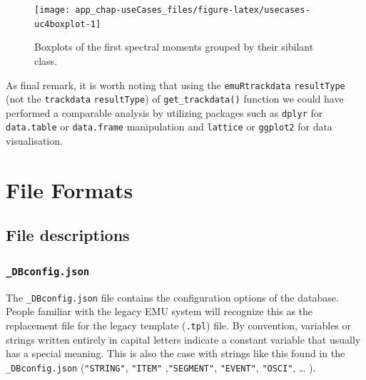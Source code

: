 \documentclass[]{book}
\newenvironment{Shaded}{\begin{snugshade}}{\end{snugshade}}
\newcommand{\DataTypeTok}[1]{\textcolor[rgb]{0.13,0.29,0.53}{#1}}
\newcommand{\KeywordTok}[1]{\textcolor[rgb]{0.13,0.29,0.53}{\textbf{#1}}}
\newcommand{\NormalTok}[1]{#1}
\newcommand{\OperatorTok}[1]{\textcolor[rgb]{0.81,0.36,0.00}{\textbf{#1}}}
\newcommand{\StringTok}[1]{\textcolor[rgb]{0.31,0.60,0.02}{#1}}
\begin{document}
\begin{Shaded}
\end{Shaded}

\begin{figure}

{\centering \texttt{[image: app\_chap-useCases\_files/figure-latex/usecases-uc4boxplot-1]} 

}

\caption{Boxplots of the first spectral moments grouped by their sibilant class.}\label{fig:usecases-uc4boxplot}
\end{figure}

As final remark, it is worth noting that using the \texttt{emuRtrackdata} \texttt{resultType} (not the \texttt{trackdata} \texttt{resultType}) of \texttt{get\_trackdata()} function we could have performed a comparable analysis by utilizing packages such as \texttt{dplyr} for \texttt{data.table} or \texttt{data.frame} manipulation and \texttt{lattice} or \texttt{ggplot2} for data visualisation.

\hypertarget{app-chap:fileFormats}{%
\chapter{File Formats}\label{app-chap:fileFormats}}

\hypertarget{file-descriptions}{%
\section{File descriptions}\label{file-descriptions}}

\hypertarget{subsec:app-chapFileFormatsDBconfig}{%
\subsection{\texorpdfstring{\texttt{\_DBconfig.json}}{\_DBconfig.json}}\label{subsec:app-chapFileFormatsDBconfig}}

The \texttt{\_DBconfig.json} file contains the configuration options of the database. People familiar with the legacy EMU system will recognize this as the replacement file for the legacy template (\texttt{.tpl}) file. By convention, variables or strings written entirely in capital letters indicate a constant variable that usually has a special meaning. This is also the case with strings like this found in the \texttt{\_DBconfig.json} (\texttt{"STRING"}, \texttt{"ITEM"} ,\texttt{"SEGMENT"}, \texttt{"EVENT"}, \texttt{"OSCI"}, \ldots{} ).
\end{document}
